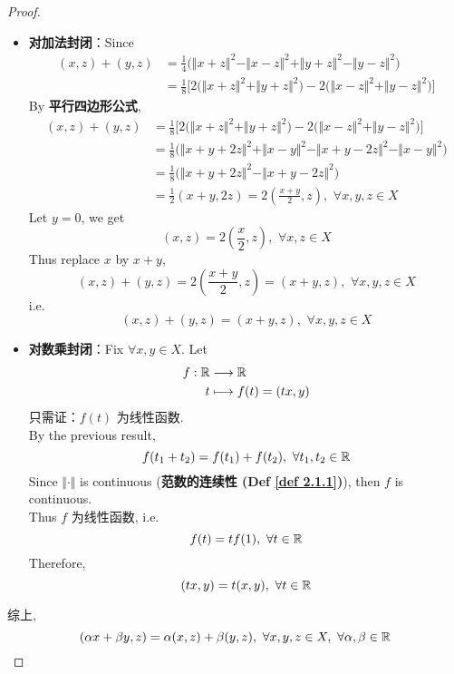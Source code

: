 \begin{thm}
\begin{proof}
			\begin{itemize}
				\item \textbf{对加法封闭}：Since
				\begin{align}
					(x , z) + (y , z) 
					&= \frac{1}{4} \Big( \Vert x + z \Vert^2 - \Vert x - z \Vert^2 + \Vert y + z \Vert^2 - \Vert y - z \Vert^2 \Big) \\
					&= \frac{1}{8} \Big[ 2 \Big( \Vert x + z \Vert^2 + \Vert y + z \Vert^2 \Big) - 2 \Big( \Vert x - z \Vert^2 + \Vert y - z \Vert^2 \Big) \Big]
				\end{align}
				By \textbf{平行四边形公式}, 
				\begin{align}
					(x , z) + (y , z) 
					&= \frac{1}{8} \Big[ 2 \Big( \Vert x + z \Vert^2 + \Vert y + z \Vert^2 \Big) - 2 \Big( \Vert x - z \Vert^2 + \Vert y - z \Vert^2 \Big) \Big] \\
					&= \frac{1}{8} \Big( \Vert x + y + 2z \Vert^2 + \Vert x - y \Vert^2 - \Vert x + y - 2z \Vert^2 - \Vert x - y \Vert^2 \Big) \\ 
					&= \frac{1}{8} \Big( \Vert x + y + 2z \Vert^2 - \Vert x + y - 2z \Vert^2 \Big) \\
					&= \frac{1}{2} (x + y , 2z) 
					= 2 \left( \frac{x + y}{2} , z \right) , \,\, \forall x , y , z \in X
				\end{align}
				Let $y = 0$, we get
				\[ (x , z) = 2 \left( \frac{x}{2} , z \right) , \,\, \forall x , z \in X \]
				Thus replace $x$ by $x + y$, 
				\[ (x , z) + (y , z) = 2 \left( \frac{x + y}{2} , z \right) = (x + y , z) , \,\, \forall x , y , z \in X \]
				i.e. 
				\[ (x , z) + (y , z) = (x + y , z) , \,\, \forall x , y , z \in X \]
				
				\newpage
				
				\item \textbf{对数乘封闭}：Fix $\forall x , y \in X$. Let
				\begin{align}
					f : \mathbb{R} &\longrightarrow \mathbb{R} \\
					t &\longmapsto f(t) = (tx , y)
				\end{align}
				只需证：$f(t)$ 为线性函数. \\
				By the previous result, 
				\[ f(t_1 + t_2) = f(t_1) + f(t_2) , \,\, \forall t_1 , t_2 \in \mathbb{R} \]
				Since $\Vert \cdot \Vert$ is continuous (\textbf{范数的连续性 (Def \ref{def 2.1.1})}), then $f$ is continuous. \\
				Thus $f$ 为线性函数, i.e.
				\[ f(t) = tf(1) , \,\, \forall t \in \mathbb{R} \]
				Therefore, 
				\[ (tx , y) = t(x , y) , \,\, \forall t \in \mathbb{R} \]
			\end{itemize}
			
			综上, 
			\[ (\alpha x + \beta y , z) = \alpha (x , z) + \beta (y , z) , \,\, \forall x , y , z \in X , \,\, \forall \alpha , \beta \in \mathbb{R} \]
		\end{proof}
	\end{thm}
	
















	\ifx\allfiles\undefined

\fi